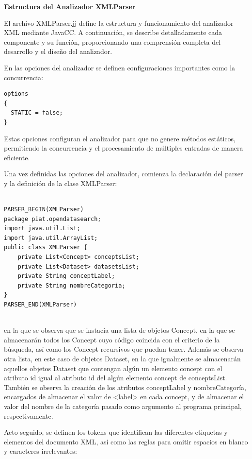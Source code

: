 \phantom{text}

\noindent \textbf{Estructura del Analizador XMLParser}

\phantom{text}

\noindent El archivo XMLParser.jj define la estructura y funcionamiento del analizador XML mediante JavaCC. A continuación, se describe detalladamente cada componente y su función, proporcionando una comprensión completa del desarrollo y el diseño del analizador.

En las opciones del analizador se definen configuraciones importantes como la concurrencia:

\lstset{inputencoding=utf8/latin1}
\begin{lstlisting}
options
{
  STATIC = false;
}
\end{lstlisting}

Estas opciones configuran el analizador para que no genere métodos estáticos, permitiendo la concurrencia y el procesamiento de múltiples entradas de manera eficiente.

Una vez definidas las opciones del analizador, comienza la declaración del parser y la definición de la clase XMLParser:

\lstset{inputencoding=utf8/latin1}
\begin{lstlisting}
    
PARSER_BEGIN(XMLParser)
package piat.opendatasearch;
import java.util.List;
import java.util.ArrayList;
public class XMLParser {
    private List<Concept> conceptsList;
    private List<Dataset> datasetsList;
    private String conceptLabel;
    private String nombreCategoria;
}
PARSER_END(XMLParser)
    
\end{lstlisting}

en la que se observa que se instacia una lista de objetos Concept, en la que se almacenarán todos los Concept cuyo código coincida con el criterio de la búsqueda, así como los Concept recursivos que puedan tener.
Además se observa otra lista, en este caso de objetos Dataset, en la que igualmente se almacenarán aquellos objetos Dataset que contengan algún un elemento concept con el atributo id igual al atributo id del algún elemento concept de conceptsList.
También se observa la creación de los atributos conceptLabel y nombreCategoría, encargados de almacenar el valor de <label> en cada concept, y de almacenar el valor del nombre de la categoría pasado como argumento al programa principal, respectivamente.

Acto seguido, se definen los tokens que identifican las diferentes etiquetas y elementos del documento XML, así como las reglas para omitir espacios en blanco y caracteres irrelevantes:

